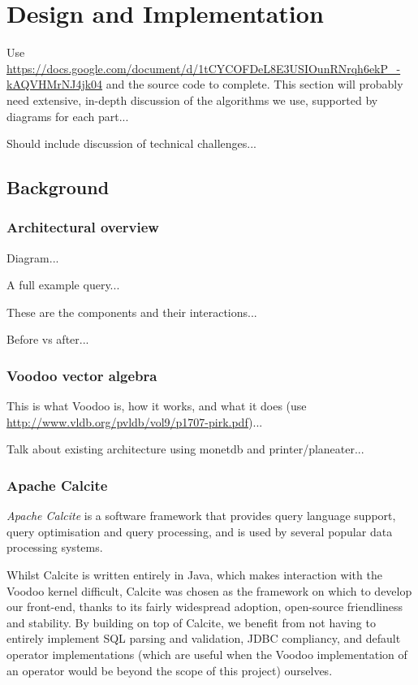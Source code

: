 \chapter{Design and Implementation}

Use \url{https://docs.google.com/document/d/1tCYCOFDeL8E3USIOunRNrqh6ekP_-kAQVHMrNJ4jk04} and the source code to complete. This section will probably need extensive, in-depth discussion of the algorithms we use, supported by diagrams for each part...

Should include discussion of technical challenges...

\section{Background}

\subsection{Architectural overview}

Diagram...

A full example query...

These are the components and their interactions...

Before vs after...

\subsection{Voodoo vector algebra}

This is what Voodoo is, how it works, and what it does (use \url{http://www.vldb.org/pvldb/vol9/p1707-pirk.pdf})...

Talk about existing architecture using monetdb and printer/planeater...

\subsection{Apache Calcite}

\emph{Apache Calcite} \cite{Begoli:2018:ACF:3183713.3190662} is a software framework that provides query language support, query optimisation and query processing, and is used by several popular data processing systems.

Whilst Calcite is written entirely in Java, which makes interaction with the Voodoo kernel difficult, Calcite was chosen as the framework on which to develop our front-end, thanks to its fairly widespread adoption, open-source friendliness and stability. By building on top of Calcite, we benefit from not having to entirely implement SQL parsing and validation, JDBC compliancy, and default operator implementations (which are useful when the Voodoo implementation of an operator would be beyond the scope of this project) ourselves.

